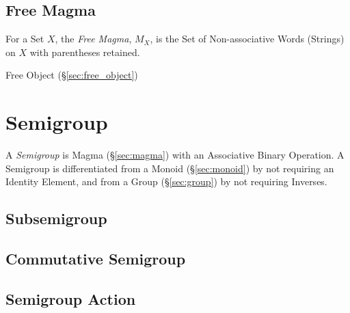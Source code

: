 \subsection{Free Magma}\label{sec:free_magma}

For a Set $X$, the \emph{Free Magma}, $M_X$, is the Set of
Non-associative Words (Strings) on $X$ with parentheses retained.

Free Object (\S\ref{sec:free_object})



\section{Semigroup}\label{sec:semigroup}

A \emph{Semigroup} is Magma (\S\ref{sec:magma}) with an Associative
Binary Operation. A Semigroup is differentiated from a Monoid
(\S\ref{sec:monoid}) by not requiring an Identity Element, and from
a Group (\S\ref{sec:group}) by not requiring Inverses.



\subsection{Subsemigroup}\label{sec:subsemigroup}

\subsection{Commutative Semigroup}\label{sec:commutative_semigroup}

\subsection{Semigroup Action}\label{sec:semigroup_action}

